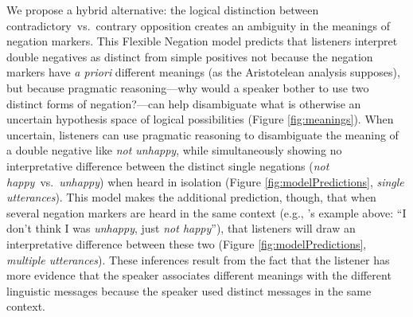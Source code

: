 \documentclass[floatsintext,doc]{apa6}
\let\rmarkdownfootnote\footnote%
\def\footnote{\protect\rmarkdownfootnote}
\newcommand{\ourmodel}{Flexible Negation\xspace}
\begin{document}
We propose a hybrid alternative: the logical distinction between contradictory~vs.~contrary opposition creates an ambiguity in the meanings of negation markers. 
This \ourmodel model predicts that listeners interpret double negatives as distinct from simple positives not because the negation markers have \emph{a priori} different meanings (as the Aristotelean analysis supposes), but because pragmatic reasoning---why would a speaker bother to use two distinct forms of negation?---can help disambiguate what is otherwise an uncertain hypothesis space of logical possibilities (Figure \ref{fig:meanings}).
When uncertain, listeners can use pragmatic reasoning to disambiguate the meaning of a double
negative like \emph{not unhappy}, while simultaneously showing no interpretative difference
between the distinct single negations (\emph{not happy}~vs.~\emph{unhappy}) when heard
in isolation (Figure \ref{fig:modelPredictions}, \emph{single utterances}). This model makes
the additional prediction, though, that when several negation markers are heard in the same
context (e.g., 's example above: ``I don't think I was
\emph{unhappy}, just \emph{not happy}''), that listeners will draw an interpretative difference
between these two (Figure \ref{fig:modelPredictions}, \emph{multiple utterances}). These
inferences result from the fact that the listener has more evidence that the speaker associates
different meanings with the different linguistic messages because the speaker
used distinct messages in the same context.
\end{document}
